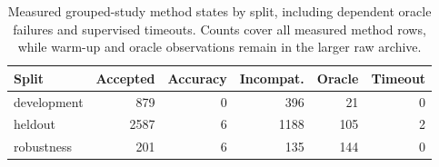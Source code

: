 \begin{table}[htbp]\centering\footnotesize
\caption{Measured grouped-study method states by split, including dependent oracle failures and supervised timeouts. Counts cover all measured method rows, while warm-up and oracle observations remain in the larger raw archive.}\label{tab:coupled-states}
\begin{tabularx}{\textwidth}{@{}>{\raggedright\arraybackslash}Xrrrrr@{}}\toprule
Split & Accepted & Accuracy & Incompat. & Oracle & Timeout\\\midrule
development & 879 & 0 & 396 & 21 & 0\\
heldout & 2587 & 6 & 1188 & 105 & 2\\
robustness & 201 & 6 & 135 & 144 & 0\\
\bottomrule\end{tabularx}
\end{table}
